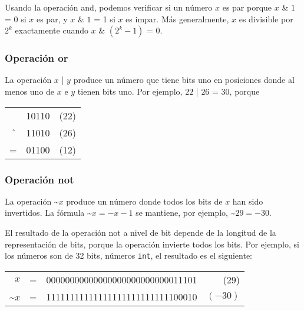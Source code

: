 Usando la operación and, podemos verificar si un número
$x$ es par porque
$x$ \& $1$ = 0 si $x$ es par, y
$x$ \& $1$ = 1 si $x$ es impar.
Más generalmente, $x$ es divisible por $2^k$
exactamente cuando $x$ \& $(2^k-1)$ = 0.

\subsubsection{Operación or}


La operación  $x$ | $y$ produce un número
que tiene bits uno en posiciones donde al menos uno
de $x$ e $y$ tienen bits uno.
Por ejemplo, $22$ | $26$ = 30, porque


\begin{center}
    \begin{tabular}{rrr}
               & 10110 & (22) \\
        $\XOR$ & 11010 & (26) \\
        \hline
        =      & 01100 & (12) \\
    \end{tabular}
\end{center}

\subsubsection{Operación not}


La operación  \textasciitilde$x$
produce un número donde todos los bits de $x$
han sido invertidos.
La fórmula \textasciitilde$x = -x-1$ se mantiene,
por ejemplo, \textasciitilde$29 = -30$.

El resultado de la operación not a nivel de bit
depende de la longitud de la representación de bits,
porque la operación invierte todos los bits.
Por ejemplo, si los números son de 32 bits,
números \texttt{int}, el resultado es el siguiente:

\begin{center}
    \begin{tabular}{rrrr}
        $x$                & = & 00000000000000000000000000011101 & (29)    \\
        \textasciitilde$x$ & = & 11111111111111111111111111100010 & $(-30)$ \\
    \end{tabular}
\end{center}


